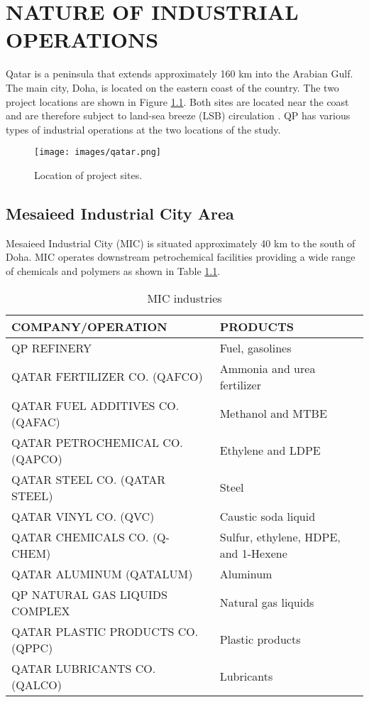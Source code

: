 \chapter{NATURE OF INDUSTRIAL OPERATIONS}
Qatar is a peninsula that extends approximately 160 km into the Arabian Gulf. The main city, Doha, is located on the eastern coast of the country. The two project locations are shown in Figure \ref{fig:qatar}. Both sites are located near the coast and are therefore subject to land-sea breeze (LSB) circulation .  QP has various types of industrial operations at the two locations of the study.\\

\begin{figure}[H]
\centering
\texttt{[image: images/qatar.png]} 
\caption{Location of project sites.}
\label{fig:qatar}
\end{figure}
%

\section{Mesaieed Industrial City Area}
Mesaieed Industrial City (MIC) is situated approximately 40 km to the south of Doha. MIC operates downstream petrochemical facilities providing a wide range of chemicals and polymers as shown in Table \ref{tab:MIC}.

\begin{table}[H]
\centering
\caption{MIC industries}
\label{tab:MIC}
\begin{tabular}{@{}ll@{}}
\toprule
\textbf{COMPANY/OPERATION} & \textbf{PRODUCTS} \\ \midrule
QP REFINERY & Fuel, gasolines \\
QATAR FERTILIZER CO. (QAFCO) & Ammonia and urea fertilizer \\
QATAR FUEL ADDITIVES CO. (QAFAC) & Methanol and MTBE \\
QATAR PETROCHEMICAL CO. (QAPCO) & Ethylene and LDPE \\
QATAR STEEL CO. (QATAR STEEL) & Steel \\
QATAR VINYL CO. (QVC) & Caustic soda liquid \\
QATAR CHEMICALS CO. (Q-CHEM) & Sulfur, ethylene, HDPE, and 1-Hexene \\
QATAR ALUMINUM (QATALUM) & Aluminum \\
QP NATURAL GAS LIQUIDS COMPLEX & Natural gas liquids \\
QATAR PLASTIC PRODUCTS CO. (QPPC) & Plastic products \\
QATAR LUBRICANTS CO. (QALCO) & Lubricants \\ \bottomrule
\end{tabular}
\end{table}


